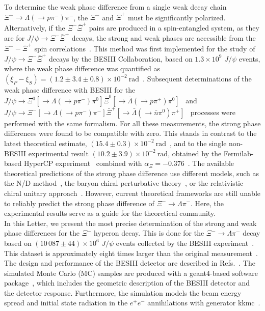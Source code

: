 \documentclass[aps,amsmath,amssymb,reprint]{revtex4-2}
\newcommand{\xim}{\Xi^{-}}
\newcommand{\XXb}{\Xi^{-}\bar{\Xi}^{+}}
\newcommand{\jpsi}{J/\psi}
\begin{document}
To determine the weak phase difference from a single weak decay chain $\Xi^- \to \Lambda(\to p \pi^-) \pi^-$, the $\Xi^-$ and $\bar{\Xi}^+$ must be significantly polarized. Alternatively, if the $\Xi^-\bar{\Xi}^+$ pairs are produced in a spin-entangled system, as they are for $J/\psi\to\Xi^-\bar{\Xi}^+$ decays, the strong and weak phases are accessible from the $\Xi^- -\bar{\Xi}^+$ spin correlations~\cite{Adlarson:2019jtw, BESIII:2021ypr}. This method was first implemented for the study of $\jpsi\to\XXb$ decays by the BESIII Collaboration, based on $1.3\times 10^9$ $J/\psi$ events, where the weak phase difference was quantified as $(\xi_{P}-\xi_{S})=(1.2\pm3.4\pm0.8)\times10^{-2}~\text{rad}$~\cite{BESIII:2021ypr}. Subsequent determinations of the weak phase difference with BESIII for the  $\jpsi\to\Xi^0[\to\Lambda(\to p\pi^-)\pi^0]\bar{\Xi}^0[\to\bar{\Lambda}(\to \bar{p}\pi^+)\pi^0]$~\cite{Besiii:2023drj} and $\jpsi\to\Xi^-[\to\Lambda(\to p\pi^-)\pi^-]\bar{\Xi}^+[\to\bar{\Lambda}(\to \bar{n}\pi^0)\pi^+]$~\cite{BESIII:2023jhj} processes were performed with
the same formalism. For all these measurements, the strong phase differences were found to be compatible with zero.
This stands in contrast to the latest theoretical estimate, $(15.4\pm0.3)\times10^{-2}~\text{rad}$~\cite{Huang:2017bmx}, and to the single non-BESIII experimental result $(10.2\pm3.9)\times 10^{-2}~\text{rad}$, obtained by the Fermilab-based HyperCP experiment~\cite{HyperCP:2004zvh} combined with $\alpha_{\Xi}=-0.376$~\cite{BESIII:2021ypr,Note1}.
The available theoretical predictions of the strong phase difference use different models, such as the N/D method~\cite{Nath:1965iud}, the baryon chiral perturbative theory~\cite{Lu:1994ex, Kamal:1998se, Datta:1998pv, Datta_1995, Tandean:2000dx, Kaiser:2001hr, Barros:2004pw, Huang:2017bmx},
or the relativistic chiral unitary approach~\cite{Meissner:2000re, Oller:2005ig, Oller:2006jw, Guo:2012vv}.
However, current theoretical frameworks are still unable to reliably predict the strong phase difference of $\Xi^-\to\Lambda\pi^-$. Here, the experimental results serve as a guide for the theoretical community.\\

In this Letter, we present the most precise determination of the strong and weak phase differences for the $\Xi^-$ hyperon decay. This is done for the $\xim\to\Lambda\pi^-$ decay based on $(10\,087\pm44)\times10^{6}$ $J/\psi$ events collected by the BESIII experiment~\cite{BESIII:2021cxx}. This dataset is approximately eight times larger than the original measurement~\cite{BESIII:2021ypr}.
The design and performance of the BESIII detector are described in Refs.~\cite{BESIII:2009fln, BES:2001vqx, Yu:2016cof}.
The simulated Monte Carlo (MC) samples are produced with a {\sc geant4}-based software package~\cite{GEANT4:2002zbu}, which includes the geometric description of the BESIII detector and the
detector response. Furthermore, the simulation models the beam
energy spread and initial state radiation in the $e^+e^-$
annihilations with generator {\sc
kkmc}~\cite{Jadach:2000ir}.
\end{document}
